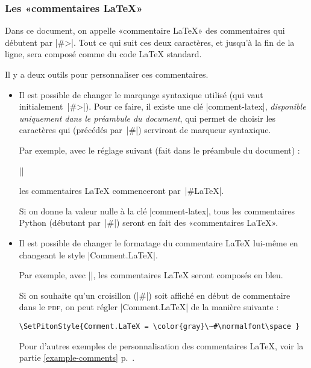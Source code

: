 \documentclass[dvipsnames,svgnames]{article}
\begin{document}
\subsubsection{Les «commentaires LaTeX»}


Dans ce document, on appelle «commentaire LaTeX» des commentaires qui débutent par |#>|. Tout ce qui suit ces deux 
caractères, et jusqu'à la fin de la ligne, sera composé comme du code LaTeX standard.

Il y a deux outils pour personnaliser ces commentaires.

\begin{itemize}
\item Il est possible de changer le marquage syntaxique utilisé (qui vaut initialement~|#>|). Pour ce faire, il
existe une clé |comment-latex|, \emph{disponible uniquement dans le préambule du document}, qui permet de choisir les
caractères qui (précédés par~|#|) serviront de marqueur syntaxique.

Par exemple, avec le réglage suivant (fait dans le préambule du document) :

||

les commentaires LaTeX commenceront par~|#LaTeX|.

Si on donne la valeur nulle à la clé |comment-latex|, tous les commentaires Python (débutant par~|#|) seront en
fait des «commentaires LaTeX».

\smallskip
\item Il est possible de changer le formatage du commentaire LaTeX lui-même en changeant le style 
|Comment.LaTeX|.

Par exemple, avec ||, les commentaires LaTeX seront composés
en bleu.

Si on souhaite qu'un croisillon (|#|) soit affiché en début de commentaire dans le \textsc{pdf}, on peut régler
|Comment.LaTeX| de la manière suivante :

\begin{Verbatim}
\SetPitonStyle{Comment.LaTeX = \color{gray}\~#\normalfont\space }
\end{Verbatim}

Pour d'autres exemples de personnalisation des commentaires LaTeX, voir la partie \ref{example-comments}
p.~\pageref{example-comments}. 
\end{itemize}
\end{document}
